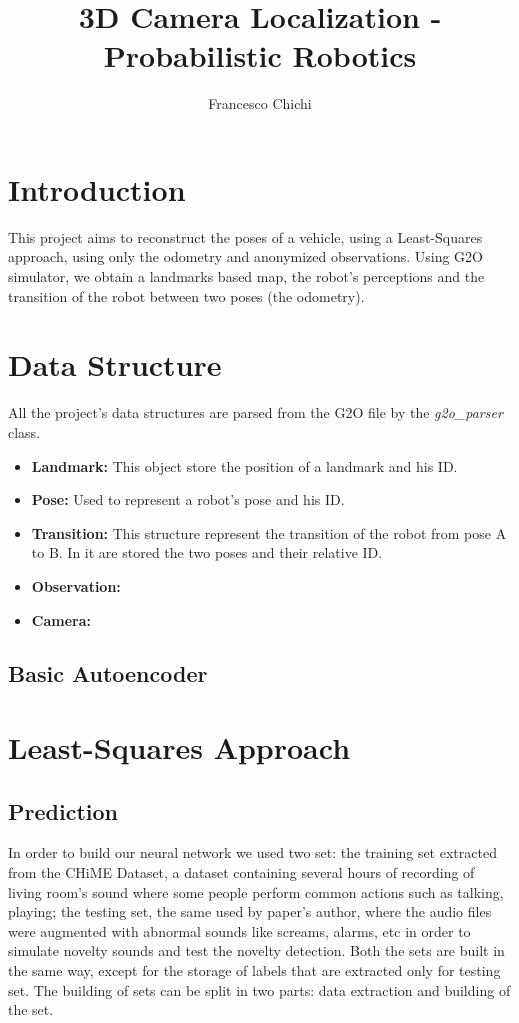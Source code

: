 \documentclass[10pt]{article}
\title{3D Camera Localization - Probabilistic Robotics}
\author{ Francesco Chichi}
\begin{document}
	\maketitle
	\section{Introduction}
		This project aims to reconstruct the poses of a vehicle, using a Least-Squares approach, using only the odometry and anonymized observations. 
		Using G2O simulator, we obtain a landmarks based map, the robot's perceptions and the transition of the robot between two poses (the odometry).

	\section{Data Structure}
		All the project's data structures are parsed from the G2O file by the \textit{g2o\_parser} class.
		\begin{itemize}
			\item \textbf{Landmark:} This object store the position of a landmark and his ID.
			\item \textbf{Pose:} Used to represent a robot's pose and his ID.
			\item \textbf{Transition:} This structure represent the transition of the robot from pose A to B. In it are stored the two poses and their relative ID.
			\item \textbf{Observation:} 
			\item \textbf{Camera:}

		\end{itemize}
	\subsection{Basic Autoencoder}

	\section{Least-Squares Approach}
	\subsection{Prediction}
	In order to build our neural network we used two set: the training set extracted from the CHiME Dataset, a dataset containing several hours of recording of living room's sound where some people perform common actions such as talking, playing; the testing set, the same used by paper's author, where the audio files were augmented with abnormal sounds like screams, alarms, etc in order to simulate novelty sounds and test the novelty detection.
	Both the sets are built in the same way, except for the storage of labels that are extracted only for testing set. The building of sets can be split in two parts: data extraction and building of the set.\\
	
\end{document}
